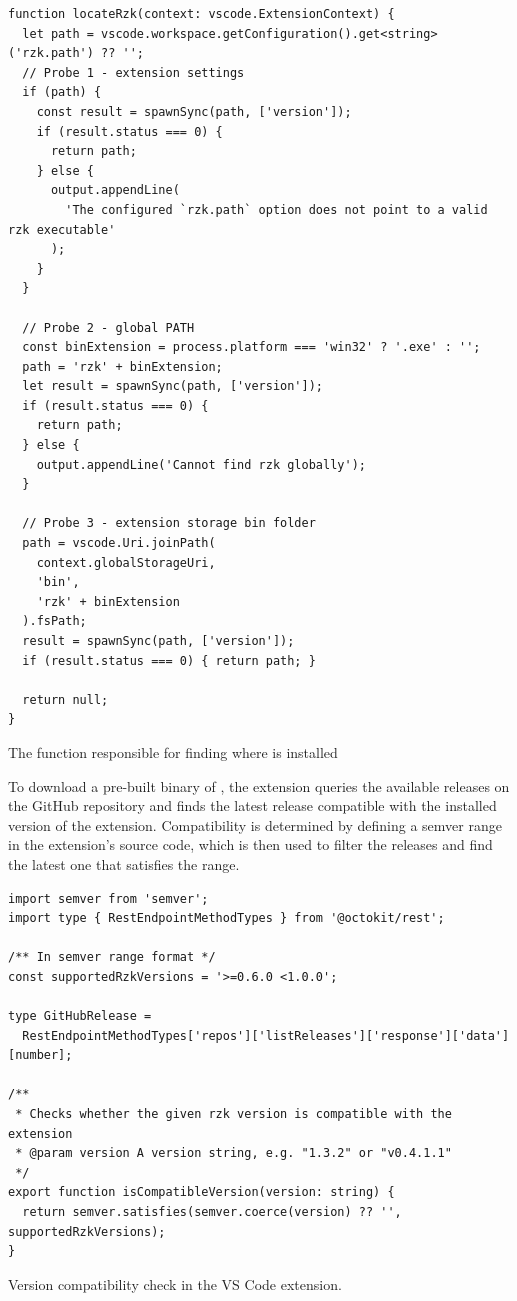 \begin{listing}
  \begin{verbatim}
function locateRzk(context: vscode.ExtensionContext) {
  let path = vscode.workspace.getConfiguration().get<string>('rzk.path') ?? '';
  // Probe 1 - extension settings
  if (path) {
    const result = spawnSync(path, ['version']);
    if (result.status === 0) {
      return path;
    } else {
      output.appendLine(
        'The configured `rzk.path` option does not point to a valid rzk executable'
      );
    }
  }

  // Probe 2 - global PATH
  const binExtension = process.platform === 'win32' ? '.exe' : '';
  path = 'rzk' + binExtension;
  let result = spawnSync(path, ['version']);
  if (result.status === 0) {
    return path;
  } else {
    output.appendLine('Cannot find rzk globally');
  }

  // Probe 3 - extension storage bin folder
  path = vscode.Uri.joinPath(
    context.globalStorageUri,
    'bin',
    'rzk' + binExtension
  ).fsPath;
  result = spawnSync(path, ['version']);
  if (result.status === 0) { return path; }

  return null;
}
  \end{verbatim}
  \caption{The function responsible for finding where \Rzk{} is installed}
  \label{code:locate-rzk}
\end{listing}

To download a pre-built binary of \Rzk{}, the extension queries the available releases on the
GitHub repository and finds the latest release compatible with the installed version of the extension.
Compatibility is determined by defining a semver \cite{Preston2013semantic} range in the extension's source code,
which is then used to filter the releases and find the latest one that satisfies the range.

\begin{listing}
  \begin{verbatim}
import semver from 'semver';
import type { RestEndpointMethodTypes } from '@octokit/rest';

/** In semver range format */
const supportedRzkVersions = '>=0.6.0 <1.0.0';

type GitHubRelease =
  RestEndpointMethodTypes['repos']['listReleases']['response']['data'][number];

/**
 * Checks whether the given rzk version is compatible with the extension
 * @param version A version string, e.g. "1.3.2" or "v0.4.1.1"
 */
export function isCompatibleVersion(version: string) {
  return semver.satisfies(semver.coerce(version) ?? '', supportedRzkVersions);
}
  \end{verbatim}
  \caption{Version compatibility check in the VS Code extension.}
  \label{code:ext-version}
\end{listing}


